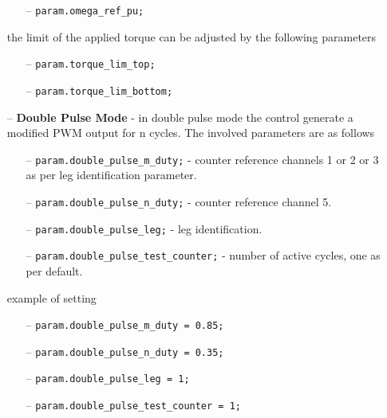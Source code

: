 \documentclass[11pt,a4paper,oneside]{book}
\numberwithin{equation}{section}
\theoremstyle{it}
\theoremstyle{definition}
\begin{document}
\begin{itemize}
\begin{itemize}
		\item[--] \texttt{param.omega\_ref\_pu;}     
	\end{itemize} 
	the limit of the applied torque can be adjusted by the following parameters
	\begin{itemize}
		\item[--] \texttt{param.torque\_lim\_top;}
		\item[--] \texttt{param.torque\_lim\_bottom;}
	\end{itemize}   
	\item[--] \textbf{Double Pulse Mode} - in double pulse mode the control generate a modified PWM output for n cycles. The involved parameters are as follows
	\begin{itemize}
		\item[--] \texttt{param.double\_pulse\_m\_duty;} - counter reference channels 1 or 2 or 3 as per leg identification parameter.   	
		\item[--] \texttt{param.double\_pulse\_n\_duty;} - counter reference channel 5.
		\item[--] \texttt{param.double\_pulse\_leg;} - leg identification.
		\item[--] \texttt{param.double\_pulse\_test\_counter;} - number of active cycles, one as per default.
	\end{itemize} 
	example of setting
	\begin{itemize}
		\item[--] \texttt{param.double\_pulse\_m\_duty = 0.85;}   	
		\item[--] \texttt{param.double\_pulse\_n\_duty = 0.35;}
		\item[--] \texttt{param.double\_pulse\_leg = 1;}
		\item[--] \texttt{param.double\_pulse\_test\_counter = 1;}
	\end{itemize}  
\end{itemize} 
\end{document}
